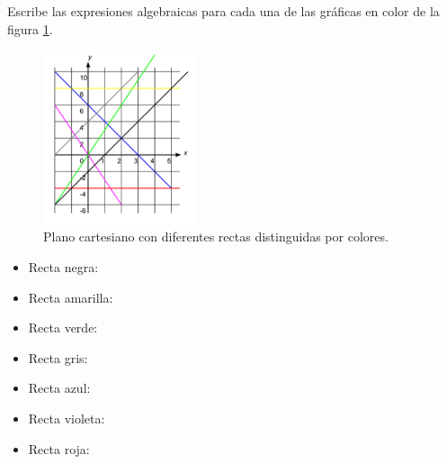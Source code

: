\question[20] Escribe las expresiones algebraicas para cada una de las gr\'aficas en color de la figura \ref{fig:SINMAT1_U3_AC78_IMG1}.
\begin{figure}[H]
    \centering
    \includegraphics[width=0.4\textwidth]{../images/SINMAT1_U3_AC78_IMG1}
    \caption{Plano cartesiano con diferentes rectas distinguidas por colores.}
    \label{fig:SINMAT1_U3_AC78_IMG1}
\end{figure}

\begin{itemize}
    \item Recta negra: \fillin[$y = 2x - 2$][3cm]
    \item {\color{yellow} Recta amarilla}: \fillin[$y = 8$][3cm]
    \item {\color{green} Recta verde}: \fillin[$y = 3x$][3cm]
    \item {\color{gray} Recta gris}: \fillin[$y = 2x + 4$][3cm]
    \item {\color{blue} Recta azul}: \fillin[$y = -2x + 6$][3cm]
    \item {\color{purple} Recta violeta}: \fillin[$y = -3x $][3cm]
    \item {\color{red} Recta roja}: \fillin[$y = -4$][3cm]
\end{itemize}
